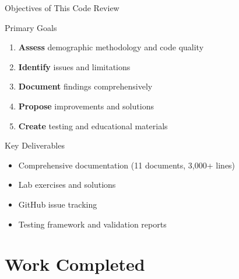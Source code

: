 \documentclass[aspectratio=169]{beamer}
\begin{document}
\begin{frame}{Objectives of This Code Review}
\begin{block}{Primary Goals}
\begin{enumerate}
    \item \textbf{Assess} demographic methodology and code quality
    \item \textbf{Identify} issues and limitations
    \item \textbf{Document} findings comprehensively
    \item \textbf{Propose} improvements and solutions
    \item \textbf{Create} testing and educational materials
\end{enumerate}
\end{block}

\vspace{0.3cm}

\begin{block}{Key Deliverables}
\begin{itemize}
    \item Comprehensive documentation (11 documents, 3,000+ lines)
    \item Lab exercises and solutions
    \item GitHub issue tracking
    \item Testing framework and validation reports
\end{itemize}
\end{block}
\end{frame}

\section{Work Completed}
\end{document}
